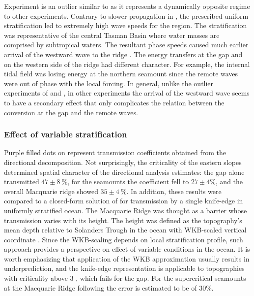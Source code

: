 \documentclass[12pt]{article}
\begin{document}
Experiment  is an outlier similar to  as it represents a dynamically 
opposite regime to other experiments. Contrary to slower propagation in , the prescribed 
uniform stratification led to extremely high wave speeds for the region. The stratification was 
representative 
of the central Tasman Basin where water masses are comprised by subtropical waters. The resultant 
phase speeds 
caused much earlier arrival of the westward wave to the ridge . The energy transfers at the gap and on the western side of the ridge had different 
character. For example, the internal tidal field was losing energy at the northern seamount 
 since the remote waves were out of phase with the local forcing. In general, 
unlike the outlier experiments of  and , in other experiments the arrival of 
the westward wave seems to have a secondary effect that only complicates the relation between the 
conversion at the gap and the remote waves.

\subsubsection{Effect of variable stratification}
\label{C3.sec:strat_eff}
Purple filled dots on  represent transmission coefficients 
obtained from the directional decomposition. Not surprisingly, the criticality of the eastern 
slopes determined spatial character of the directional analysis estimates: the gap alone 
transmitted $47 
\pm 8~\%$, for the seamounts 
the coefficient fell to $27 \pm 4\%$, and the overall Macquarie ridge showed $35 \pm 4~\%$. In 
addition, these results were compared to a closed-form solution of 
\cite{larsen1969internal} for transmission by a single knife-edge in uniformly stratified ocean. 
The Macquarie Ridge was thought 
as a barrier whose transmission varies with its height. The height was defined as the 
topography's mean depth relative to Solanders Trough in the ocean with WKB-scaled vertical 
coordinate 
\citep{althaus2003internal}. Since the WKB-scaling depends on local stratification profile, such 
approach provides a perspective on effect of variable conditions in the ocean. It is worth 
emphasizing that application of the WKB approximation usually results in underprediction, 
and the 
knife-edge representation is applicable to topographies with criticality above 3 
\citep{mathur2016internal}, which fails 
for the gap. For the supercritical seamounts at the Macquarie Ridge following 
\cite{mathur2016internal} the error is estimated to be of $30\%$.\\
\end{document}

